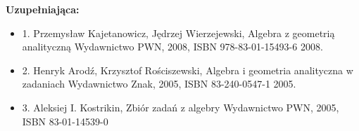 \documentclass[12pt, a4paper]{article}
\begin{document}
\textbf{Uzupełniająca:}
\begin{itemize}
  \item 1. Przemysław Kajetanowicz, Jędrzej Wierzejewski, Algebra z geometrią analityczną Wydawnictwo PWN, 2008, ISBN 978-83-01-15493-6 2008.
  \item 2. Henryk Arodź, Krzysztof Rościszewski, Algebra i geometria analityczna w zadaniach Wydawnictwo Znak, 2005, ISBN 83-240-0547-1 2005.
  \item 3. Aleksiej I. Kostrikin, Zbiór zadań z algebry Wydawnictwo PWN, 2005, ISBN 83-01-14539-0
\end{itemize}
\end{document}
